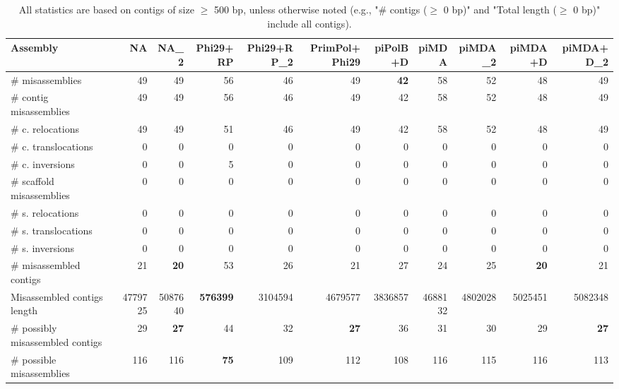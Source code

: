 \documentclass[12pt,a4paper]{article}
\begin{document}
\begin{table}[ht]
\begin{center}
\caption{All statistics are based on contigs of size $\geq$ 500 bp, unless otherwise noted (e.g., "\# contigs ($\geq$ 0 bp)" and "Total length ($\geq$ 0 bp)" include all contigs).}
\begin{tabular}{|l*{10}{|r}|}
\hline
Assembly & NA & NA\_2 & Phi29+RP & Phi29+RP\_2 & PrimPol+Phi29 & piPolB+D & piMDA & piMDA\_2 & piMDA+D & piMDA+D\_2 \\ \hline
\# misassemblies & 49 & 49 & 56 & 46 & 49 & {\bf 42} & 58 & 52 & 48 & 49 \\ \hline
\hspace{2mm}\# contig misassemblies & 49 & 49 & 56 & 46 & 49 & 42 & 58 & 52 & 48 & 49 \\ \hline
\hspace{5mm}\# c. relocations & 49 & 49 & 51 & 46 & 49 & 42 & 58 & 52 & 48 & 49 \\ \hline
\hspace{5mm}\# c. translocations & 0 & 0 & 0 & 0 & 0 & 0 & 0 & 0 & 0 & 0 \\ \hline
\hspace{5mm}\# c. inversions & 0 & 0 & 5 & 0 & 0 & 0 & 0 & 0 & 0 & 0 \\ \hline
\hspace{2mm}\# scaffold misassemblies & 0 & 0 & 0 & 0 & 0 & 0 & 0 & 0 & 0 & 0 \\ \hline
\hspace{5mm}\# s. relocations & 0 & 0 & 0 & 0 & 0 & 0 & 0 & 0 & 0 & 0 \\ \hline
\hspace{5mm}\# s. translocations & 0 & 0 & 0 & 0 & 0 & 0 & 0 & 0 & 0 & 0 \\ \hline
\hspace{5mm}\# s. inversions & 0 & 0 & 0 & 0 & 0 & 0 & 0 & 0 & 0 & 0 \\ \hline
\# misassembled contigs & 21 & {\bf 20} & 53 & 26 & 21 & 27 & 24 & 25 & {\bf 20} & 21 \\ \hline
Misassembled contigs length & 4779725 & 5087640 & {\bf 576399} & 3104594 & 4679577 & 3836857 & 4688132 & 4802028 & 5025451 & 5082348 \\ \hline
\# possibly misassembled contigs & 29 & {\bf 27} & 44 & 32 & {\bf 27} & 36 & 31 & 30 & 29 & {\bf 27} \\ \hline
\hspace{5mm}\# possible misassemblies & 116 & 116 & {\bf 75} & 109 & 112 & 108 & 116 & 115 & 116 & 113 \\ \hline

\end{tabular}
\end{center}
\end{table}
\end{document}
